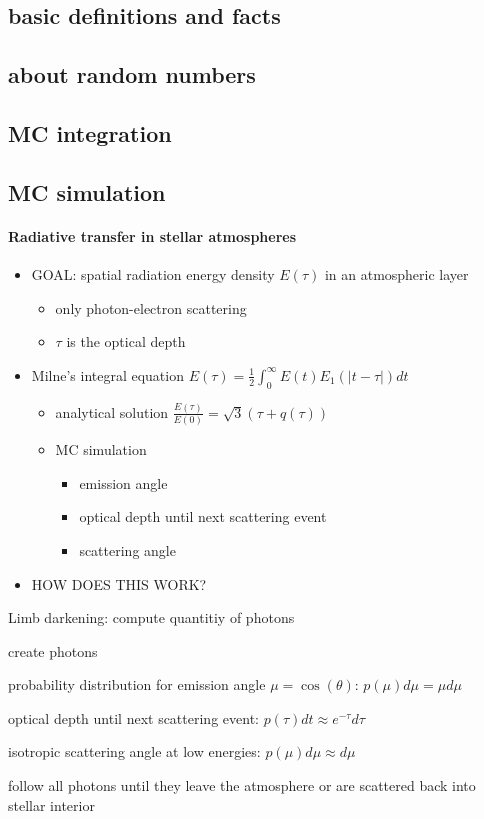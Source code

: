 \documentclass[../main/main.tex]{subfiles}
\begin{document}
\subsection{basic definitions and facts}
\subsection{about random numbers}
\subsection{MC integration}
\subsection{MC simulation}
\paragraph{Radiative transfer in stellar atmospheres}
\begin{itemize}
\item GOAL: spatial radiation energy density $E(\tau)$ in an atmospheric layer 
\begin{itemize}
\item only photon-electron scattering
\item $\tau$ is the optical depth
\end{itemize}

\item Milne's integral equation $\boxed{E(\tau) = \frac{1}{2} \int_0^{\infty} E(t) E_1(|t-\tau|) dt}$
\begin{itemize}
\item analytical solution $\frac{E(\tau)}{E(0)} = \sqrt{3} (\tau + q(\tau))$
\item MC simulation
\begin{itemize}
\item emission angle
\item optical depth until next scattering event
\item scattering angle
\end{itemize}
\end{itemize}

\item HOW DOES THIS WORK?
\end{itemize}

\begin{algorithm}
\caption{Limb darkening: compute quantitiy of photons}\label{limb_darkening}
\begin{algorithmic}
\State create photons

\State probability distribution for emission angle $\mu = \cos(\theta)$: $\boxed{p(\mu) d \mu = \mu d \mu}$

\State optical depth until next scattering event: $\boxed{p(\tau)dt \approx e^{-\tau} d\tau}$

\State isotropic scattering angle at low energies: $\boxed{p(\mu) d\mu \approx d\mu}$

\State follow all photons until they leave the atmosphere or are scattered back into stellar interior
\end{algorithmic}
\end{algorithm}
\end{document}
